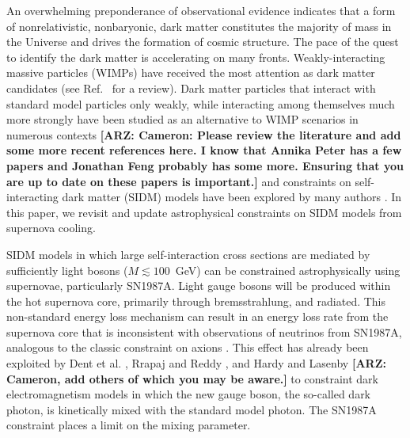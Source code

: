 \documentclass[nofootinbib,prd,superscriptaddress,twocolumn]{revtex4}
\newcommand{\arz}[1]{{{\bf{\color{BrickRed}[ARZ: #1]}}}}
\begin{document}
An overwhelming preponderance of observational evidence indicates that a form of nonrelativistic, nonbaryonic, 
dark matter constitutes the majority of mass in the Universe and drives the formation of cosmic structure. 
The pace of the quest to identify the dark matter is accelerating on many fronts. Weakly-interacting massive 
particles (WIMPs) have received the most attention as dark matter candidates (see Ref.~\cite{jungman_etal96} for a review). 
Dark matter particles that interact with standard model particles only weakly, while interacting among themselves 
much more strongly have been studied as an alternative to WIMP scenarios in numerous contexts 
\cite{carlson_etal92,deLaix_etal95,atrio-barandela_davidson97,spergel_steinhardt00,hogan_dalcanton00,mohapatra_teplitz00,
dave_etal01,hisano_etal04,hisano_etal05,pospelov_etal08,arkani-hamed_etal08a,lattanzi_silk08,ackerman_etal09,feng_etal09,
kong_etal15} \arz{Cameron: Please review the literature and add some more recent references here. 
I know that Annika Peter has a few papers and Jonathan Feng probably has some more. 
Ensuring that you are up to date on these papers is important.} 
and constraints on self-interacting dark matter (SIDM) models have been explored by many authors \cite{yoshida_etal00,gnedin_ostriker01,miralda-escude02,randall_etal08,kamionkowski_profumo08,zentner09,robertson_zentner09,pieri_etal09,spolyar_etal09,finkbeiner_etal09,
slatyer_etal09,bramante_etal14,albuquerque_etal14,kaplinghat_etal14,chen_etal14,feng_etal16,catena_widmark16}. 
In this paper, we revisit and update astrophysical constraints on SIDM models from 
supernova cooling.


SIDM models in which large self-interaction cross sections are mediated by sufficiently light 
bosons ($M \lesssim 100$~GeV) can be constrained astrophysically using supernovae, particularly 
SN1987A. Light gauge bosons will be produced within the hot supernova core, primarily through 
bremsstrahlung, and radiated. This non-standard energy loss mechanism can result in an energy loss rate 
from the supernova core that is inconsistent with observations of neutrinos from SN1987A, 
analogous to the classic constraint on axions \cite{turner88,raffelt96_book}. 
This effect has already been exploited by Dent et al. \cite{dent_etal12}, Rrapaj and Reddy \cite{rrapaj_reddy16}, and 
Hardy and Lasenby \cite{hardy_lasenby17} \arz{Cameron, add others of which you may be aware.}
to constraint dark electromagnetism models in which the new gauge boson, the so-called dark photon, 
is kinetically mixed with the standard model photon. The SN1987A constraint places a limit on the mixing parameter. 
\end{document}

